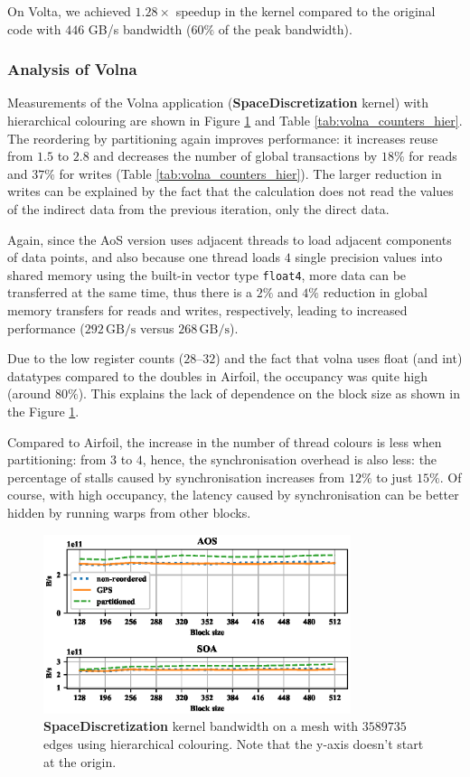 On Volta, we achieved $1.28\times$ speedup in the kernel compared to the
original code with $446$ GB/s bandwidth ($60\%$ of the peak bandwidth).

\subsubsection{Analysis of Volna}

Measurements of the Volna application (\textbf{SpaceDiscretization} kernel)
with hierarchical colouring are shown in Figure \ref{fig:volna_bw-vs-bs_hier} and Table \ref{tab:volna_counters_hier}. The
reordering by partitioning again improves performance: it increases reuse from
$1.5$ to $2.8$ and decreases the number of global transactions by $18\%$ for
reads and $37\%$ for writes (Table \ref{tab:volna_counters_hier}). The larger
reduction in writes can be explained by the fact that the calculation does not
read the values of the indirect data from the previous iteration, only the
direct data.

Again, since the AoS version uses adjacent threads to load adjacent components
of data points, and also because one thread loads $4$ single precision values
into shared memory using the built-in vector type \lstinline!float4!, more data
can be transferred at the same time, thus there is a $2\%$ and $4\%$ reduction
in global memory transfers for reads and writes, respectively, leading to
increased performance ($292\,\text{GB/s}$ versus $268\,\text{GB/s}$).

Due to the low register counts ($28$--$32$) and the fact that volna uses float
(and int) datatypes compared to the doubles in Airfoil, the occupancy was quite
high (around $80\%$).  This explains the lack of dependence on the block size as
shown in the Figure \ref{fig:volna_bw-vs-bs_hier}.

Compared to Airfoil, the increase in the number of thread colours is less when
partitioning: from $3$ to $4$, hence, the synchronisation overhead is also less:
the percentage of stalls caused by synchronisation increases from $12\%$ to just
$15\%$. Of course, with high occupancy, the latency caused by synchronisation
can be better hidden by running warps from other blocks.


\begin{figure}[Htbp]
  \centering
  \includegraphics[width=9cm]{fig/volna_bw-vs-bs_hier.eps}
  \caption{\textbf{SpaceDiscretization} kernel bandwidth on a mesh with
  $3589735$ edges using hierarchical colouring. Note that the y-axis doesn't
  start at the origin.}
  \label{fig:volna_bw-vs-bs_hier}
\end{figure}

